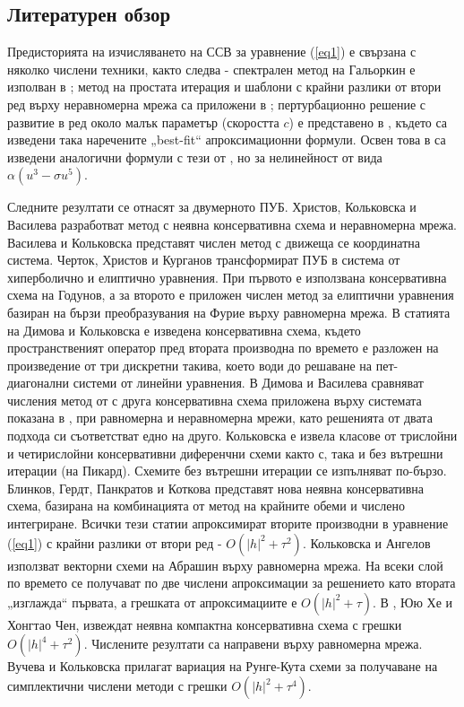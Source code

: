 \documentclass[a5paper]{article}
\newcommand{\rf}[1]{(\ref{#1})}
\theoremstyle{remark}
\begin{document}
\begin{large}
\subsection{Литературен обзор}
Предисторията на изчисляването на ССВ за уравнение \rf{eq1} е свързана с няколко числени техники, както следва - спектрален метод на Гальоркин е изполван в \cite{ref14,ref13}; метод на простата итерация и шаблони с крайни разлики от втори ред върху неравномерна мрежа са приложени в \cite{ref117,ref116}; пертурбационно решение с развитие в ред около малък параметър (скоростта $c$) е представено в \cite{ref15}, където са изведени така наречените „best-fit“ апроксимационни формули. Освен това в \cite{ref159} са изведени аналогични формули с тези от \cite{ref15}, но за нелинейност от вида $\alpha(u^3 - \sigma u^5)$.

Следните резултати се отнасят за двумерното ПУБ.
Христов, Кольковска и Василева \cite{ref20} разработват метод с неявна консервативна схема и неравномерна мрежа. Василева и Кольковска \cite{ref200} представят числен метод с движеща се координатна система. Черток, Христов и Курганов \cite{ref21} трансформират ПУБ в система от хиперболично и елиптично уравнения. При първото е използвана консервативна схема на Годунов, а за второто е приложен числен метод за елиптични уравнения базиран на бързи преобразувания на Фурие върху равномерна мрежа. В статията \cite{ref241} на Димова и Кольковска е изведена консервативна схема, където пространственият оператор пред втората производна по времето е разложен на произведение от три дискретни такива, което води до решаване на пет-диагонални системи от линейни уравнения. В \cite{ref23} Димова и Василева сравняват числения метод от \cite{ref241} с друга консервативна схема приложена върху системата показана в \cite{ref21}, при равномерна и неравномерна мрежи, като решенията от двата подхода си съответстват едно на друго. Кольковска \cite{ref25, ref251, ref252} е извела класове от трислойни и четирислойни консервативни диференчни схеми както с, така и без вътрешни итерации (на Пикард). Схемите без вътрешни итерации се изпълняват по-бързо. Блинков, Гердт, Панкратов и Коткова \cite{ref253} представят нова неявна консервативна схема, базирана на комбинацията от метод на крайните обеми и числено интегриране. Всички тези статии \cite{ref20, ref21, ref241, ref23, ref25, ref251, ref252, ref253} апроксимират вторите производни в уравнение \rf{eq1} с крайни разлики от втори ред - $O(|h|^2 + \tau^2)$. Кольковска и Ангелов \cite{ref22} използват векторни схеми на Абрашин върху равномерна мрежа. На всеки слой по времето се получават по две числени апроксимации за решението като втората „изглажда“ първата, а грешката от апроксимациите е $O(|h|^2 + \tau)$. В \cite{ref24}, Юю Хе и Хонгтао Чен, извеждат неявна компактна консервативна схема с грешки $O(|h|^4 + \tau^2)$. Числените резултати са направени върху равномерна мрежа. Вучева и Кольковска \cite{ref254} прилагат вариация на Рунге-Кута схеми за получаване на симплектични числени методи с грешки $O(|h|^2 + \tau^4)$. 


\end{large}
\end{document}
